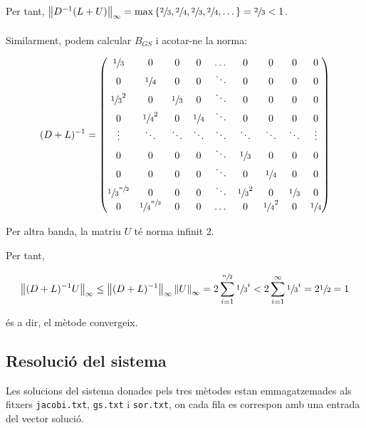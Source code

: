 \documentclass[12pt]{article}
\newcommand{\T}{\sfrac{1}{3}} %
\newcommand{\F}{\sfrac{1}{4}} %
\newcommand{\NH}{\sfrac{n}{2}} %
\begin{document}
Per tant,
$\left\lVert D^{-1}(L+U)\right\rVert_\infty
=\max{\{\sfrac{2}{3},\sfrac{2}{4},\sfrac{2}{3},\sfrac{2}{4},\dots\}}
=\sfrac{2}{3}
<1$.
\\\\
Similarment, podem calcular $B_{GS}$ i acotar-ne la norma:

\begin{equation*}
(D+L)^{-1}=
\begin{pmatrix}
    \T      & 0       & 0       & 0       & \dots   & 0       & 0       & 0       & 0       \\
    0       & \F      & 0       & 0       & \ddots  & 0       & 0       & 0       & 0       \\
    \T^2    & 0       & \T      & 0       & \ddots  & 0       & 0       & 0       & 0       \\
    0       & \F^2    & 0       & \F      & \ddots  & 0       & 0       & 0       & 0       \\
    \vdots  & \ddots  & \ddots  & \ddots  & \ddots  & \ddots  & \ddots  & \ddots  & \vdots  \\
    0       & 0       & 0       & 0       & \ddots  & \T      & 0       & 0       & 0       \\
    0       & 0       & 0       & 0       & \ddots  & 0       & \F      & 0       & 0       \\
    \T^{\NH}& 0       & 0       & 0       & \ddots  & \T^2    & 0       & \T      & 0       \\
    0       & \F^{\NH}& 0       & 0       & \dots   & 0       & \F^2    & 0       & \F
\end{pmatrix}
\end{equation*}

Per altra banda, la matriu $U$ té norma infinit $2$.

Per tant,

\begin{equation*}
\left\lVert (D+L)^{-1}U\right\rVert_\infty
\leq\left\lVert (D+L)^{-1}\right\rVert_\infty \left\lVert U\right\rVert_\infty
=2\sum_{i=1}^{\NH}{\T^i}
<2\sum_{i=1}^{\infty}{\T^i}
=2\sfrac{1}{2}
=1
\end{equation*}

és a dir, el mètode convergeix.

\subsection{Resolució del sistema}

Les solucions del sistema donades pels tres mètodes estan emmagatzemades als fitxers
\texttt{jacobi.txt}, \texttt{gs.txt} i \texttt{sor.txt}, on cada fila es correspon
amb una entrada del vector solució.
\end{document}
